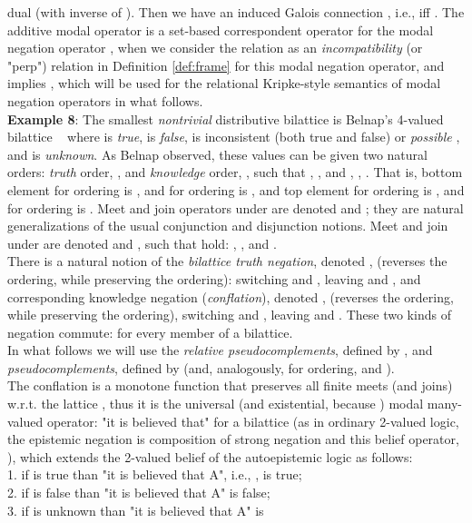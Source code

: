\documentclass[10pt,twocolumn]{article}
\begin{document}
dual (with   inverse of ). Then we have
an induced Galois connection , i.e.,  iff . The additive modal
operator  is a set-based correspondent operator for the
modal negation operator , when we consider the
relation  as an \emph{incompatibility} (or "perp") relation
  in
 Definition \ref{def:frame} for this modal negation operator, and
 implies , which will be used for the relational
Kripke-style semantics of
modal negation operators in what follows.\\
 \textbf{Example 8}:
 The smallest \emph{nontrivial} distributive bilattice is Belnap's 4-valued
bilattice  ~\cite{Beln77}  where  is
\emph{true},  is \emph{false},  is inconsistent (both true
and false) or \emph{possible }, and  is \emph{unknown}. As
Belnap observed, these values can be given two natural orders:
\emph{truth} order, , and \emph{knowledge} order, ,
such that , ,  and , , . That is, bottom element  for
 ordering is , and for  ordering is ,
 and top element  for  ordering is , and for  ordering is .
Meet and join operators under  are denoted  and
; they are natural generalizations of the usual conjunction
and disjunction notions. Meet and join under  are denoted
 and , such that hold: , ,  and .\\
There is a natural notion of the \emph{bilattice truth negation},
denoted , (reverses the  ordering, while preserving
the  ordering): switching  and , leaving  and
, and corresponding knowledge negation (\emph{conflation}),
denoted , (reverses the  ordering, while preserving the
 ordering), switching  and , leaving  and
. These two kinds of negation commute:  for every member  of a bilattice.\\
In what follows we will use the \emph{relative pseudocomplements},
defined by , and \emph{pseudocomplements}, defined by  (and, analogously, for  ordering,  and  ).
\\
 The conflation is a monotone function that preserves all
finite meets (and joins) w.r.t. the lattice , thus it
is the universal (and existential, because ) modal
many-valued operator: "it is believed that" for a bilattice (as in
ordinary 2-valued logic, the epistemic negation is composition of
strong negation  and this belief operator, ), which extends the 2-valued belief of the autoepistemic
logic as follows:\\
1. if  is true than "it is believed that A", i.e., , is
  true;\\
 2. if  is false than "it is believed that A" is
  false;\\
3. if  is unknown than "it is believed that A" is
\end{document}
